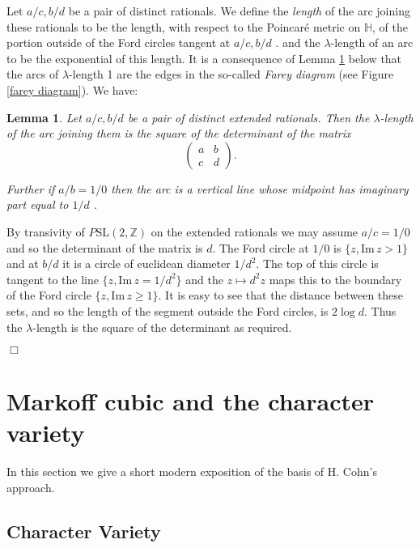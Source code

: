 \documentclass[12pt,a4paper]{amsart}
\newtheorem{lem}[thm]{Lemma}
\def\HH{\mathbb{H}}
\def\im{\mathrm{Im}\,}
\def\ZZ{\mathbb{Z}}
\def\sl2{\mathrm{SL}(2, \ZZ)}
\begin{document}
Let $a/c, b/d$ be a pair of distinct rationals. We define the \textit{length}
of the arc joining these rationals to be the length, with respect to the
Poincar\'e metric on $\HH$, of the portion  outside of the Ford circles tangent
at $a/c, b/d$ . and the $\lambda$-length of an arc to be the exponential of
this length. It is a consequence  of Lemma \ref{calcul} below  that the arcs of
$\lambda$-length 1 are the edges in the so-called \textit{Farey diagram} (see
Figure \ref{farey diagram}). We have:

\begin{lem}\label{calcul}
Let $a/c, b/d$ be a pair of distinct extended rationals.
Then the  $\lambda$-length of the arc joining them
 is the square of the determinant of the matrix
$$\begin{pmatrix}
a & b \\ c & d
\end{pmatrix}.$$

Further if $a/b = 1/0$ then the arc is a vertical line 
 whose midpoint has imaginary part equal to $1/d$ .
\end{lem}

\proof 
By transivity of $P\sl2$ on the extended rationals we may assume 
$a/c = 1/0$ and so the determinant of the matrix is $d$.
The Ford circle at $1/0$  is $\{ z, \im z > 1\}$ and
at $b/d$ it is a circle of euclidean diameter $1/d^2$.
The top of this circle is tangent to the line $\{ z, \im z = 1/d^2\}$
and the $z \mapsto d^2 z $ maps this to the boundary 
of the Ford circle $\{ z, \im z \geq 1\}$.
It is easy to see that the distance between these sets,
and so the length of the segment outside the Ford circles,
is $2\log d$. Thus the $\lambda$-length is the square of the 
determinant as required.

\hfill $\Box$


 
\section{Markoff cubic and the character variety}

In this section we give a short modern exposition of the basis of H. Cohn's
approach.

\subsection{Character Variety}
\end{document}
